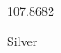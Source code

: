 \documentclass[12pt]{article}
\begin{document}
\hfill{}
\vfill
\begin{center}
  {\fontsize{50}{60}
  }

  107.8682

Silver
\end{center}
\vfill
\end{document}
